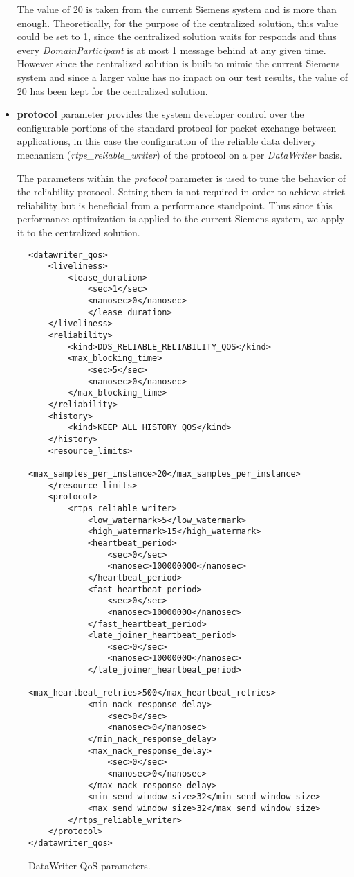 \begin{itemize}
	The value of 20 is taken from the current Siemens system and is more than enough. Theoretically, for the purpose of the centralized solution, this value could be set to 1, since the centralized solution waits for responds and thus every \textit{DomainParticipant} is at most 1 message behind at any given time. However since the centralized solution is built to mimic the current Siemens system and since a larger value has no impact on our test results, the value of 20 has been kept for the centralized solution.
	\item \textbf{protocol} parameter provides the system developer control over the configurable portions of the standard protocol for packet exchange between applications, in this case the configuration of the reliable data delivery mechanism (\textit{rtps\_reliable\_writer}) of the protocol on a per \textit{DataWriter} basis. 
	
	The parameters within the \textit{protocol} parameter is used to tune the behavior of the reliability protocol. Setting them is not required in order to achieve strict reliability but is beneficial from a performance standpoint. Thus since this performance optimization is applied to the current Siemens system, we apply it to the centralized solution.
\end{itemize}

\begin{figure}
\begin{lstlisting}
<datawriter_qos>
	<liveliness>
		<lease_duration>
			<sec>1</sec>
			<nanosec>0</nanosec>
			</lease_duration>
	</liveliness>
	<reliability>
		<kind>DDS_RELIABLE_RELIABILITY_QOS</kind>
		<max_blocking_time>
			<sec>5</sec>
			<nanosec>0</nanosec>
		</max_blocking_time>
	</reliability>
	<history>
		<kind>KEEP_ALL_HISTORY_QOS</kind>
	</history>
	<resource_limits>
		<max_samples_per_instance>20</max_samples_per_instance>
	</resource_limits>
	<protocol>
		<rtps_reliable_writer>
			<low_watermark>5</low_watermark>
			<high_watermark>15</high_watermark>
			<heartbeat_period>
				<sec>0</sec>
				<nanosec>100000000</nanosec>
			</heartbeat_period>
			<fast_heartbeat_period>
				<sec>0</sec>
				<nanosec>10000000</nanosec>
			</fast_heartbeat_period>
			<late_joiner_heartbeat_period>
				<sec>0</sec>
				<nanosec>10000000</nanosec>
			</late_joiner_heartbeat_period>
			<max_heartbeat_retries>500</max_heartbeat_retries>
			<min_nack_response_delay>
				<sec>0</sec>
				<nanosec>0</nanosec>
			</min_nack_response_delay>
			<max_nack_response_delay>
				<sec>0</sec>
				<nanosec>0</nanosec>
			</max_nack_response_delay>
			<min_send_window_size>32</min_send_window_size>
			<max_send_window_size>32</max_send_window_size>
		</rtps_reliable_writer>
	</protocol>
</datawriter_qos>
\end{lstlisting}
\caption[DataWriter QoS parameters]{
		\label{fig:writerQoS} 
		\footnotesize{DataWriter QoS parameters.}
	}
\end{figure}



